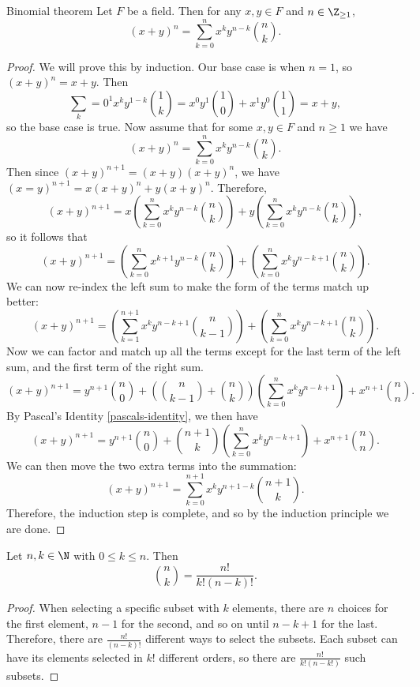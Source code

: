 \documentclass[12pt]{article}
\begin{document}
\begin{thm}{Binomial theorem}\label{binomial-theorem}\proofbreak
    Let $F$ be a field. Then for any $x, y \in F$ and $n \in \Z_{\geq 1}$, \[\left(x + y\right)^n = \sum_{k=0}^n x^ky^{n-k}\binom{n}{k}.\]
\end{thm}

\begin{proof}
    We will prove this by induction. Our base case is when $n = 1$, so $(x + y)^n = x + y$. Then \[\sum_k=0^1x^ky^{1-k}\binom{1}{k} = x^0y^1\binom{1}{0} + x^1y^0\binom{1}{1} = x + y,\] so the base case is true.
    Now assume that for some $x, y \in F$ and $n \geq 1$ we have \[\left(x + y\right)^n = \sum_{k=0}^n x^ky^{n-k}\binom{n}{k}.\] Then since $(x + y)^{n+1} = (x+y)(x+y)^n$, we have $(x = y)^{n+1} = x(x+y)^n + y(x+y)^n$.
    Therefore, \[\left(x + y\right)^{n+1} = x\left(\sum_{k=0}^n x^ky^{n-k}\binom{n}{k}\right) + y\left(\sum_{k=0}^n x^ky^{n-k}\binom{n}{k}\right),\] so it follows that \[\left(x + y\right)^{n+1} = \left(\sum_{k=0}^n x^{k+1}y^{n-k}\binom{n}{k}\right) + \left(\sum_{k=0}^n x^ky^{n-k+1}\binom{n}{k}\right).\]
    We can now re-index the left sum to make the form of the terms match up better: \[\left(x + y\right)^{n+1} = \left(\sum_{k=1}^{n+1} x^{k}y^{n-k+1}\binom{n}{k-1}\right) + \left(\sum_{k=0}^n x^ky^{n-k+1}\binom{n}{k}\right).\]
    Now we can factor and match up all the terms except for the last term of the left sum, and the first term of the right sum.
    \[\left(x + y\right)^{n+1} = y^{n+1}\binom{n}{0} + \left(\binom{n}{k-1} + \binom{n}{k}\right)\left(\sum_{k=0}^{n} x^{k}y^{n-k+1}\right) + x^{n+1}\binom{n}{n}.\]
    By Pascal's Identity \ref{pascals-identity}, we then have
    \[\left(x + y\right)^{n+1} = y^{n+1}\binom{n}{0} + \binom{n+1}{k}\left(\sum_{k=0}^{n} x^{k}y^{n-k+1}\right) + x^{n+1}\binom{n}{n}.\]
    We can then move the two extra terms into the summation:
    \[\left(x + y\right)^{n+1} = \sum_{k=0}^{n+1}x^{k}y^{n+1-k}\binom{n+1}{k}.\]
    Therefore, the induction step is complete, and so by the induction principle we are done.
\end{proof}

\begin{prop}
    Let $n, k \in \N$ with $0 \leq k \leq n$. Then \[\binom{n}{k} = \frac{n!}{k!(n-k)!}.\]
\end{prop}

\begin{proof}
    When selecting a specific subset with $k$ elements, there are $n$ choices for the first element, $n-1$ for the second, and so on until $n-k+1$ for the last. Therefore, there are $\frac{n!}{(n-k)!}$ different ways to select the subsets. Each subset can have its elements selected in $k!$ different orders, so there are $\frac{n!}{k!(n-k!)}$ such subsets.
\end{proof}
\end{document}
